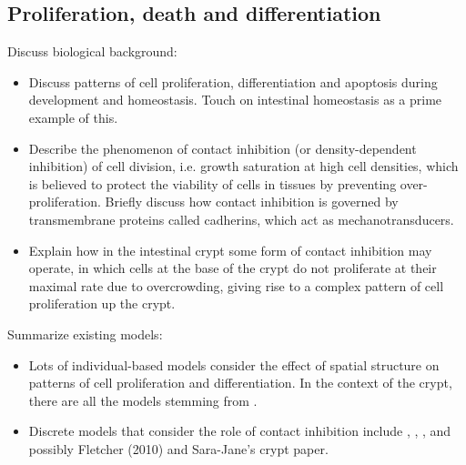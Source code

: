 \documentclass{article}
\begin{document}
\subsection{Proliferation, death and differentiation} \label{sec:proliferation}

Discuss biological background:
\begin{itemize}
\item Discuss patterns of cell proliferation, differentiation and apoptosis during development and homeostasis. Touch on intestinal homeostasis as a prime example of this.
\item Describe the phenomenon of contact inhibition (or density-dependent inhibition) of cell division, i.e. growth saturation at high cell densities, which is believed to protect the viability of cells in tissues by preventing over-proliferation. Briefly discuss how contact inhibition is governed by transmembrane proteins called cadherins, which act as mechanotransducers.
\item Explain how in the intestinal crypt some form of contact inhibition may operate, in which cells at the base of the crypt do not proliferate at their maximal rate due to overcrowding, giving rise to a complex pattern of cell proliferation up the crypt.
\end{itemize}

\noindent Summarize existing models:
\begin{itemize}
\item Lots of individual-based models consider the effect of spatial structure on patterns of cell proliferation and differentiation. In the context of the crypt, there are all the models stemming from \citet{Meineke2001Cell}.
\item Discrete models that consider the role of contact inhibition include \citet{Drasdo2003Individual}, \citet{Drasdo2007Role}, \citet{Galle2005Modeling}, and possibly Fletcher (2010) and Sara-Jane's crypt paper.
\end{itemize}
\end{document}
